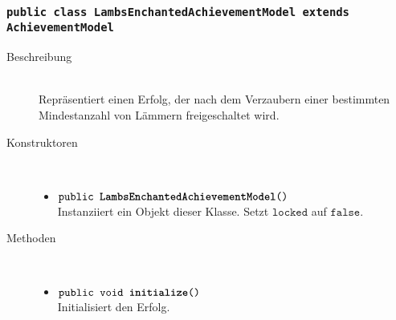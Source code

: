 		\subsubsection{\normalfont \texttt{public class \textbf{LambsEnchantedAchievementModel} extends AchievementModel}}
		
		\begin{description}
		\item[Beschreibung] \hfill \\ Repräsentiert einen Erfolg, der nach dem Verzaubern einer bestimmten Mindestanzahl von Lämmern freigeschaltet wird.
		
		\item[Konstruktoren] \hfill \\
			\vspace{-.8cm}
			\begin{itemize}
				\item $\texttt{public \textbf{LambsEnchantedAchievementModel}()}$ \\ Instanziiert ein Objekt dieser Klasse. Setzt $\texttt{locked}$ auf $\texttt{false}$.
			\end{itemize}
			
		\item[Methoden] \hfill \\
			\vspace{-.8cm}
			\begin{itemize}
						\item $\texttt{public void \textbf{initialize}()}$ \\ Initialisiert den Erfolg.
				

\end{itemize}
\end{description}
